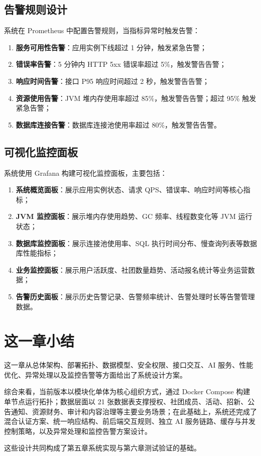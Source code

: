 \subsection{告警规则设计}

系统在 Prometheus 中配置告警规则，当指标异常时触发告警：

\begin{enumerate}
  \item \textbf{服务可用性告警}：应用实例下线超过 1 分钟，触发紧急告警；

  \item \textbf{错误率告警}：5 分钟内 HTTP 5xx 错误率超过 5\%，触发警告告警；

  \item \textbf{响应时间告警}：接口 P95 响应时间超过 2 秒，触发警告告警；

  \item \textbf{资源使用告警}：JVM 堆内存使用率超过 85\%，触发警告告警；超过 95\% 触发紧急告警；

  \item \textbf{数据库连接告警}：数据库连接池使用率超过 80\%，触发警告告警。
\end{enumerate}

\subsection{可视化监控面板}

系统使用 Grafana 构建可视化监控面板，主要包括：

\begin{enumerate}
  \item \textbf{系统概览面板}：展示应用实例状态、请求 QPS、错误率、响应时间等核心指标；

  \item \textbf{JVM 监控面板}：展示堆内存使用趋势、GC 频率、线程数变化等 JVM 运行状态；

  \item \textbf{数据库监控面板}：展示连接池使用率、SQL 执行时间分布、慢查询列表等数据库性能指标；

  \item \textbf{业务监控面板}：展示用户活跃度、社团数量趋势、活动报名统计等业务运营数据；

  \item \textbf{告警历史面板}：展示历史告警记录、告警频率统计、告警处理时长等告警管理数据。
\end{enumerate}


\section{这一章小结}

这一章从总体架构、部署拓扑、数据模型、安全权限、接口交互、AI 服务、性能优化、异常处理以及监控告警等方面给出了系统设计方案。

综合来看，当前版本以模块化单体为核心组织方式，通过 Docker Compose 构建单节点运行拓扑；数据层面以 21 张数据表支撑授权、社团成员、活动、招新、公告通知、资源财务、审计和内容治理等主要业务场景；在此基础上，系统还完成了混合认证方案、统一响应结构、前后端交互规则、独立 AI 服务链路、缓存与并发控制策略，以及异常处理和监控告警方案设计。

这些设计共同构成了第五章系统实现与第六章测试验证的基础。



